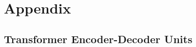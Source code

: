 \documentclass[landscape]{article}
\begin{document}

\cp
\thispagestyle{empty}
\section*{Appendix}
\vspace*{10mm}
\subsection*{Transformer Encoder-Decoder Units}
\end{document}
